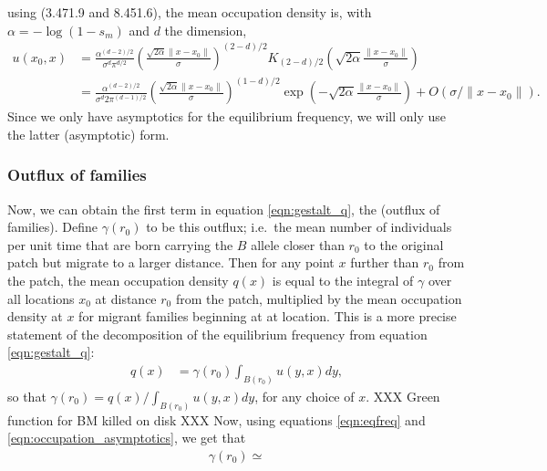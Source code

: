 \documentclass{article}
\begin{document}
using \citet{gradshteyn2007table} (3.471.9 and 8.451.6), the mean occupation density is,
with $\alpha = -\log(1-s_m)$ and $d$ the dimension,
\begin{align}
u(x_0,x) &= \frac{\alpha^{(d-2)/2}}{\sigma^d \pi^{d/2}}\left(\frac{ \sqrt{2 \alpha} \|x-x_0\|}{\sigma} \right)^{(2-d)/2} K_{(2-d)/2}\left( \sqrt{2\alpha} \frac{\|x-x_0\|}{\sigma} \right) \\
         &= \frac{\alpha^{(d-2)/2}}{\sigma^d 2 \pi^{(d-1)/2}} \left( \frac{\sqrt{2 \alpha} \|x-x_0\|}{\sigma} \right)^{(1-d)/2} \exp\left(- \sqrt{2\alpha} \frac{\|x-x_0\|}{\sigma} \right)+ O(\sigma/\|x-x_0\|) . \label{eqn:occupation_asymptotics}
\end{align}
Since we only have asymptotics for the equilibrium frequency, 
we will only use the latter (asymptotic) form.



\subsubsection*{Outflux of families}

Now, we can obtain the first term in equation \eqref{eqn:gestalt_q}, the (outflux of families).
Define $\gamma(r_0)$ to be this outflux; 
i.e.\ the mean number of individuals per unit time that are born carrying the $B$ allele closer than $r_0$ to the original patch
but migrate to a larger distance.
Then for any point $x$ further than $r_0$ from the patch, 
the mean occupation density $q(x)$ is equal to the integral of $\gamma$ over all locations $x_0$ at distance $r_0$ from the patch,
multiplied by the mean occupation density at $x$ for migrant families beginning at at location.
This is a more precise statement of the decomposition of the equilibrium frequency from equation \eqref{eqn:gestalt_q}:
\begin{align}
    q(x) &= \gamma(r_0) \int_{B(r_0)} u(y,x) dy,
\end{align}
so that $\gamma(r_0) = q(x) / \int_{B(r_0)} u(y,x) dy$, for any choice of $x$.
XXX Green function for BM killed on disk XXX
Now, using equations \eqref{eqn:eqfreq} and \eqref{eqn:occupation_asymptotics}, we get that
\begin{align}
    \gamma(r_0) \simeq 
\end{align}
\end{document}
